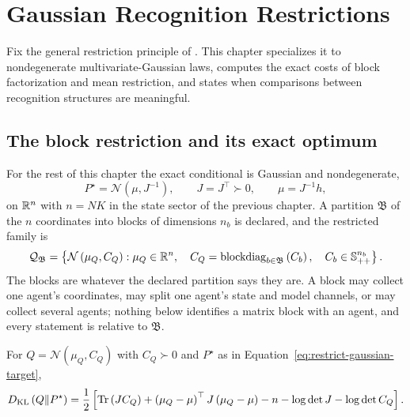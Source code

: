 \chapter{Gaussian Recognition Restrictions}
\label{ch:restrictions}

Fix the general restriction principle of .
This chapter specializes it to nondegenerate multivariate-Gaussian laws,
computes the exact costs of block factorization and mean restriction, and
states when comparisons between recognition structures are meaningful.

\section{The block restriction and its exact optimum}
\label{sec:restrict-block}

For the rest of this chapter the exact conditional is Gaussian and nondegenerate,
\begin{equation}
P^\star=\mathcal N\left(\mu,J^{-1}\right),
\qquad
J=J^\top\succ0,
\qquad
\mu=J^{-1}h,
\label{eq:restrict-gaussian-target}
\end{equation}
on $\mathbb R^{n}$ with $n=NK$ in the state sector of the previous chapter. A partition $\mathfrak B$ of the $n$ coordinates into blocks of dimensions $n_b$ is declared, and the restricted family is
\begin{equation}
\mathcal Q_{\mathfrak B}
=\left\{\mathcal N\left(\mu_Q,C_Q\right):
\mu_Q\in\mathbb R^{n},
\quad
C_Q=\operatorname{blockdiag}_{b\in\mathfrak B}\left(C_b\right),
\quad
C_b\in\mathbb S_{++}^{n_b}\right\}.
\label{eq:restrict-block-family}
\end{equation}
The blocks are whatever the declared partition says they are. A block may collect one agent's coordinates, may split one agent's state and model channels, or may collect several agents; nothing below identifies a matrix block with an agent, and every statement is relative to $\mathfrak B$.

For $Q=\mathcal N(\mu_Q,C_Q)$ with $C_Q\succ0$ and $P^\star$ as in Equation~\eqref{eq:restrict-gaussian-target},
\begin{equation}
D_{\mathrm{KL}}\left(Q\Vert P^\star\right)
=\frac12\left[
\operatorname{Tr}\left(JC_Q\right)
+\left(\mu_Q-\mu\right)^\top J\left(\mu_Q-\mu\right)
-n
-\log\det J
-\log\det C_Q
\right].
\label{eq:restrict-gaussian-kl}
\end{equation}

